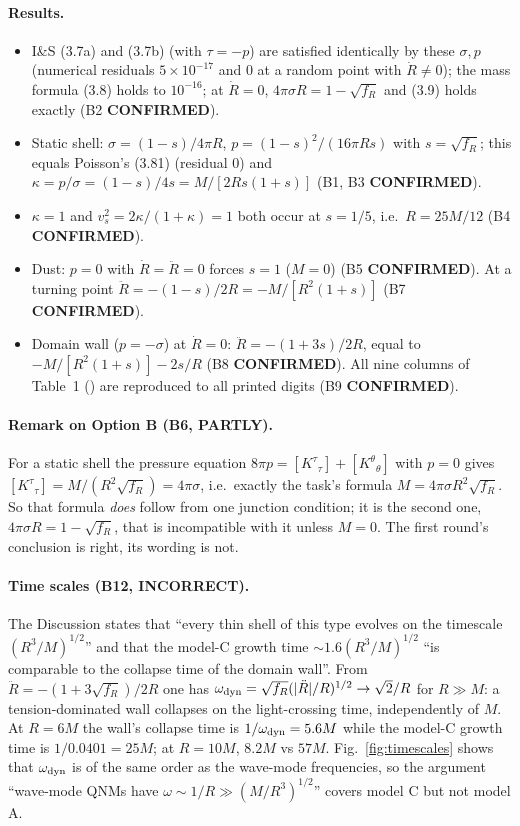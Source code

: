 \documentclass[11pt,a4paper]{article}
\newcommand{\sq}{\sqrt{f_R}}
\newcommand{\OK}{\textcolor{green!50!black}{\textbf{CONFIRMED}}}
\newcommand{\PART}{\textcolor{orange!85!black}{\textbf{PARTLY}}}
\newcommand{\NO}{\textcolor{red!75!black}{\textbf{INCORRECT}}}
\newcommand{\file}[1]{{\small\path{#1}}}
\begin{document}
\paragraph{Results.}
\begin{itemize}
\item I\&S (3.7a) and (3.7b) (with $\tau=-p$) are satisfied identically by these $\sigma,p$ (numerical residuals
$5\times10^{-17}$ and $0$ at a random point with $\dot R\ne0$); the mass formula (3.8) holds to $10^{-16}$; at
$\dot R=0$, $4\pi\sigma R=1-\sq$ and (3.9) holds exactly (B2 \OK).
\item Static shell: $\sigma=(1-s)/4\pi R$, $p=(1-s)^2/(16\pi Rs)$ with $s=\sq$; this equals Poisson's (3.81)
(residual 0) and $\kappa=p/\sigma=(1-s)/4s=M/[2Rs(1+s)]$ (B1, B3 \OK).
\item $\kappa=1$ and $v_s^2=2\kappa/(1+\kappa)=1$ both occur at $s=1/5$, i.e.\ $R=25M/12$ (B4 \OK).
\item Dust: $p=0$ with $\dot R=\ddot R=0$ forces $s=1$ ($M=0$) (B5 \OK). At a turning point
$\ddot R=-(1-s)/2R=-M/[R^2(1+s)]$ (B7 \OK).
\item Domain wall ($p=-\sigma$) at $\dot R=0$: $\ddot R=-(1+3s)/2R$, equal to $-M/[R^2(1+s)]-2s/R$ (B8 \OK).
All nine columns of Table~1 (\file{background.tex}) are reproduced to all printed digits (B9 \OK).
\end{itemize}
\paragraph{Remark on Option B (B6, \PART).} For a static shell the pressure equation
$8\pi p=[K^\tau{}_\tau]+[K^\theta{}_\theta]$ with $p=0$ gives $[K^\tau{}_\tau]=M/(R^2\sq)=4\pi\sigma$, i.e.\ exactly the
task's formula $M=4\pi\sigma R^2\sq$. So that formula \emph{does} follow from one junction condition; it is the
second one, $4\pi\sigma R=1-\sq$, that is incompatible with it unless $M=0$. The first round's conclusion is right,
its wording is not.

\paragraph{Time scales (B12, \NO).} The Discussion states that ``every thin shell of this type evolves on the
timescale $(R^3/M)^{1/2}$'' and that the model-C growth time $\sim1.6(R^3/M)^{1/2}$ ``is comparable to the collapse
time of the domain wall''. From $\ddot R=-(1+3\sq)/2R$ one has $\omega_{\rm dyn}=\sq(|\ddot R|/R)^{1/2}\to\sqrt2/R$
for $R\gg M$: a tension-dominated wall collapses on the light-crossing time, independently of $M$. At $R=6M$
the wall's collapse time is $1/\omega_{\rm dyn}=5.6M$ while the model-C growth time is $1/0.0401=25M$; at $R=10M$,
$8.2M$ vs $57M$. Fig.~\ref{fig:timescales} shows that $\omega_{\rm dyn}$ is of the same order as the wave-mode
frequencies, so the argument ``wave-mode QNMs have $\omega\sim1/R\gg(M/R^3)^{1/2}$'' covers model C but not model A.
\end{document}
